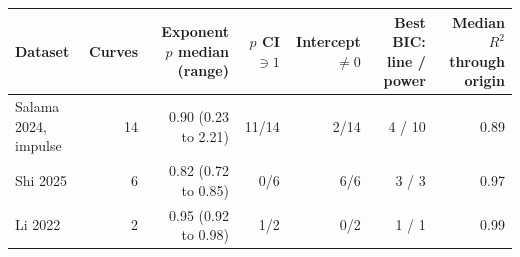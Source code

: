 \begin{tabular}{l r r r r r r}
\toprule
Dataset & Curves & Exponent $p$ median (range) & $p$ CI $\ni 1$ & Intercept $\neq 0$ & Best BIC: line / power & Median $R^2$ through origin \\
\midrule
Salama 2024, impulse & 14 & 0.90 (0.23 to 2.21) & 11/14 & 2/14 & 4 / 10 & 0.89 \\
Shi 2025 & 6 & 0.82 (0.72 to 0.85) & 0/6 & 6/6 & 3 / 3 & 0.97 \\
Li 2022 & 2 & 0.95 (0.92 to 0.98) & 1/2 & 0/2 & 1 / 1 & 0.99 \\
\bottomrule
\end{tabular}
